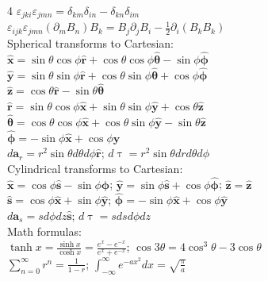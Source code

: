 \documentclass[a4paper,twoside]{article}
\begin{document}
\begin{multicols*}{4}
\(\varepsilon_{jki}\varepsilon_{jmn} = \delta_{km}\delta_{in} - \delta_{kn}\delta_{im}\) \\
\(\varepsilon_{ijk}\varepsilon_{jmn}(\partial_m B_n)B_k = B_j\partial_j B_i - \tfrac{1}{2}\partial_i(B_k B_k)\) \\
Spherical transforms to Cartesian: \\
\(\hat{\bm x} = \sin \theta \cos \phi \hat{\bm r} + \cos \theta \cos \phi \hat{\bm \theta}-\sin \phi \hat{\bm \phi}\) \\
\(\hat{\bm y} = \sin\theta \sin \phi \hat{\bm r} + \cos\theta \sin \phi \hat{\bm \theta} + \cos \phi \hat{\bm \phi}\) \\
\(\hat{\bm z} = \cos \theta \hat{\bm r} - \sin \theta \hat{\bm \theta}\) \\
\(\hat{\bm{r}} = \sin\theta \cos \phi \hat{\bm x} + \sin \theta \sin \phi \hat{\bm y}+\cos \theta \hat{\bm z}\) \\
\(\hat{\bm \theta} = \cos\theta\cos\phi \hat{\bm x} + \cos\theta\sin\phi \hat{\bm y} - \sin\theta \hat{\bm z}\) \\
\(\hat{\bm \phi} = -\sin\phi \hat{\bm x} + \cos\phi \hat{\bm y}\) \\
\(d \bm a_r = r^2 \sin \theta d\theta d\phi \hat{\bm r}\); \quad $d\uptau = r^2\sin\theta dr d\theta d\phi$ \\
Cylindrical transforms to Cartesian: \\
\(\hat{\bm x} = \cos \phi \hat{\bm s} - \sin \phi \hat{\bm \phi}\); \quad \(\hat{\bm y} = \sin \phi \hat{\bm s} + \cos \phi \hat{\bm \phi}\); \quad $\hat{\bm z} = \hat{\bm z}$ \\
\(\hat{\bm s} = \cos \phi \hat{\bm x} + \sin \phi \hat{\bm y}\); \quad \(\hat{\bm \phi} = -\sin \phi \hat{\bm x} + \cos \phi \hat{\bm y}\) \\
$d\bm a_s = s d\phi dz \hat{\bm s}$; \quad $d\uptau = s ds d\phi dz$ \\
Math formulas: \\
\(\tanh x = \frac{\sinh x}{\cosh x} = \frac{e^x - e^{-x}}{e^x + e^{-x}}\); \quad \(\cos 3 \theta = 4 \cos^3 \theta - 3 \cos \theta\) \\
\(\sum_{n=0}^{\infty} r^n = \frac{1}{1-r}\); \quad $\int_{-\infty}^{\infty} e^{-ax^2} dx = \sqrt{\frac{\pi}{a}}$


\end{multicols*}
\end{document}
